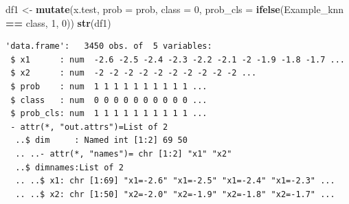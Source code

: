 \documentclass[
]{krantz}
\makeatletter
\newenvironment{Shaded}{\begin{snugshade}}{\end{snugshade}}
\newcommand{\DataTypeTok}[1]{\textcolor[rgb]{0.27,0.27,0.27}{#1}}
\newcommand{\DecValTok}[1]{\textcolor[rgb]{0.06,0.06,0.06}{#1}}
\newcommand{\KeywordTok}[1]{\textcolor[rgb]{0.27,0.27,0.27}{\textbf{#1}}}
\newcommand{\NormalTok}[1]{#1}
\newcommand{\OperatorTok}[1]{\textcolor[rgb]{0.43,0.43,0.43}{\textbf{#1}}}
\newcommand{\StringTok}[1]{\textcolor[rgb]{0.5,0.5,0.5}{#1}}
\newenvironment{kframe}{%
\medskip{}
\setlength{\fboxsep}{.8em}
 \def\at@end@of@kframe{}%
 \ifinner\ifhmode%
  \def\at@end@of@kframe{\end{minipage}}%
  \begin{minipage}{\columnwidth}%
 \fi\fi%
 \def\FrameCommand##1{\hskip\@totalleftmargin \hskip-\fboxsep
 \colorbox{shadecolor}{##1}\hskip-\fboxsep
     \hskip-\linewidth \hskip-\@totalleftmargin \hskip\columnwidth}%
 \MakeFramed {\advance\hsize-\width
   \@totalleftmargin\z@ \linewidth\hsize
   \@setminipage}}%
 {\par\unskip\endMakeFramed%
 \at@end@of@kframe}
\renewenvironment{Shaded}{\begin{kframe}}{\end{kframe}}
\makeatother
\begin{document}
\begin{Shaded}
\begin{Highlighting}[]
\NormalTok{df1 \textless{}{-}}\StringTok{ }\KeywordTok{mutate}\NormalTok{(x.test, }\DataTypeTok{prob =}\NormalTok{ prob, }\DataTypeTok{class =} \DecValTok{0}\NormalTok{,  }\DataTypeTok{prob\_cls =} \KeywordTok{ifelse}\NormalTok{(Example\_knn }\OperatorTok{==}\StringTok{ }\NormalTok{class, }\DecValTok{1}\NormalTok{, }\DecValTok{0}\NormalTok{))}
\KeywordTok{str}\NormalTok{(df1)}
\end{Highlighting}
\end{Shaded}

\begin{verbatim}
'data.frame':	3450 obs. of  5 variables:
 $ x1      : num  -2.6 -2.5 -2.4 -2.3 -2.2 -2.1 -2 -1.9 -1.8 -1.7 ...
 $ x2      : num  -2 -2 -2 -2 -2 -2 -2 -2 -2 -2 ...
 $ prob    : num  1 1 1 1 1 1 1 1 1 1 ...
 $ class   : num  0 0 0 0 0 0 0 0 0 0 ...
 $ prob_cls: num  1 1 1 1 1 1 1 1 1 1 ...
 - attr(*, "out.attrs")=List of 2
  ..$ dim     : Named int [1:2] 69 50
  .. ..- attr(*, "names")= chr [1:2] "x1" "x2"
  ..$ dimnames:List of 2
  .. ..$ x1: chr [1:69] "x1=-2.6" "x1=-2.5" "x1=-2.4" "x1=-2.3" ...
  .. ..$ x2: chr [1:50] "x2=-2.0" "x2=-1.9" "x2=-1.8" "x2=-1.7" ...
\end{verbatim}
\end{document}
